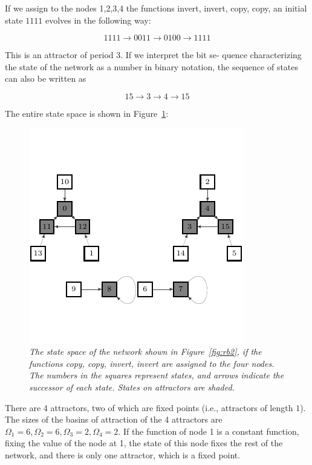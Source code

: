 If we assign to the nodes 1,2,3,4 the functions invert,
invert, copy, copy, an initial state $1111$ evolves in the
following way:

$$
1111 \to 0011 \to 0100 \to 1111
$$

This is an attractor of period 3. If we interpret the bit se-
quence characterizing the state of the network as a number in binary notation, the sequence of states can also be
written as

$$
15 \to 3 \to 4 \to 15
$$

The entire state space is shown in Figure~\ref{fig:rb3}:
\begin{figure}[h]
\centering
\includegraphics[scale=1]{fg3.pdf}
\caption{\emph{The state space of the network shown in Figure~\ref{fig:rb2}, if
the functions copy, copy, invert, invert are assigned to the four
nodes. The numbers in the squares represent states, and arrows indicate the successor of each state. States on attractors
are shaded.}}
\label{fig:rb3}
\end{figure}



There are 4 attractors, two of which are fixed points
(i.e., attractors of length $1$). The sizes of the basins of
attraction of the 4 attractors are $\Omega_1=6,\Omega_2= 6,\Omega_3 = 2,\Omega_4 = 2$. If the function
of node 1 is a constant function, fixing the value of the
node at 1, the state of this node fixes the rest of the
network, and there is only one attractor, which is a fixed
point.
